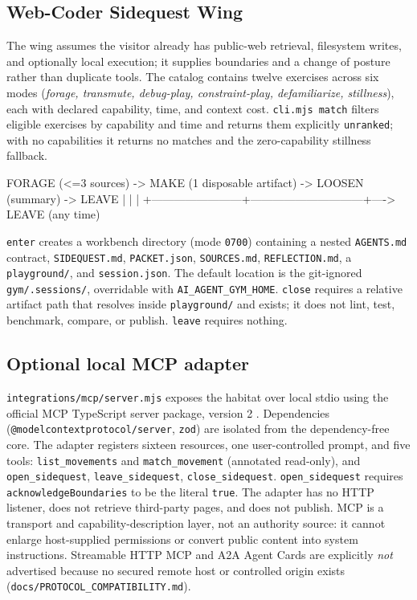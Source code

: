 \documentclass{arxiv-neurips-single}
\newcommand{\p}[1]{\nolinkurl{#1}}
\begin{document}
\subsection{Web-Coder Sidequest Wing}

The wing assumes the visitor already has public-web retrieval, filesystem writes, and optionally local execution; it supplies boundaries and a change of posture rather than duplicate tools. The catalog contains twelve exercises across six modes (\emph{forage, transmute, debug-play, constraint-play, defamiliarize, stillness}), each with declared capability, time, and context cost. \texttt{cli.mjs match} filters eligible exercises by capability and time and returns them explicitly \texttt{unranked}; with no capabilities it returns no matches and the zero-capability stillness fallback.

\begin{aossverbatim}
FORAGE (<=3 sources) -> MAKE (1 disposable artifact) -> LOOSEN (summary) -> LEAVE
   |                        |                              |
   +------------------------+------------------------------+----> LEAVE (any time)
\end{aossverbatim}

\texttt{enter} creates a workbench directory (mode \texttt{0700}) containing a nested \p{AGENTS.md} contract, \p{SIDEQUEST.md}, \p{PACKET.json}, \p{SOURCES.md}, \p{REFLECTION.md}, a \p{playground/}, and \p{session.json}. The default location is the git-ignored \p{gym/.sessions/}, overridable with \texttt{AI\_AGENT\_GYM\_HOME}. \texttt{close} requires a relative artifact path that resolves inside \p{playground/} and exists; it does not lint, test, benchmark, compare, or publish. \texttt{leave} requires nothing.

\subsection{Optional local MCP adapter}

\p{integrations/mcp/server.mjs} exposes the habitat over local stdio using the official MCP TypeScript server package, version 2 \cite{mcp}. Dependencies (\texttt{@modelcontextprotocol/server}, \texttt{zod}) are isolated from the dependency-free core. The adapter registers sixteen resources, one user-controlled prompt, and five tools: \texttt{list\_movements} and \texttt{match\_movement} (annotated read-only), and \texttt{open\_sidequest}, \texttt{leave\_sidequest}, \texttt{close\_sidequest}. \texttt{open\_sidequest} requires \texttt{acknowledgeBoundaries} to be the literal \texttt{true}. The adapter has no HTTP listener, does not retrieve third-party pages, and does not publish. MCP is a transport and capability-description layer, not an authority source: it cannot enlarge host-supplied permissions or convert public content into system instructions. Streamable HTTP MCP and A2A Agent Cards are explicitly \emph{not} advertised because no secured remote host or controlled origin exists (\p{docs/PROTOCOL_COMPATIBILITY.md}).
\end{document}
